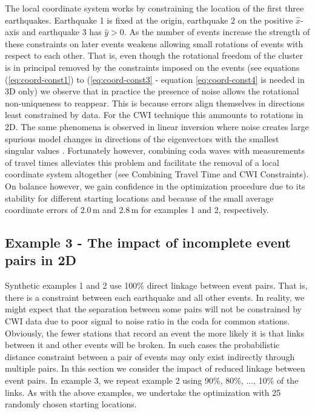 \documentclass[12pt,double]{article}
\begin{document}
The local coordinate system works by constraining the location of
the first three earthquakes. Earthquake 1 is fixed at the origin,
earthquake 2 on the positive $\hat{x}$-axis and earthquake 3 has
$\hat{y}>0$. As the number of events increase the strength of these
constraints on later events weakens allowing small rotations of
events with respect to each other. That is, even though the
rotational freedom of the cluster is in principal removed by the
constraints imposed on the events (see equations
(\ref{eq:coord-const1}) to (\ref{eq:coord-const3} - equation
\ref{eq:coord-const4} is needed in 3D only) we observe that in
practice the presence of noise allows the rotational non-uniqueness
to reappear. This is because errors align themselves in directions
least constrained by data. For the CWI technique this ammounts to rotations in 2D.
The same phenomena is observed in linear inversion where noise
creates large spurious model changes in directions of the
eigenvectors with the smallest singular values \citep{dr_Aster05a}.
 Fortunately however, combining coda waves with
measurements of travel times alleviates this problem and facilitate
the removal of a local coordinate system altogether (see Combining Travel Time and 
CWI Constraints). On balance however, we gain
confidence in the optimization procedure due to its stability for
different starting locations and because of the small average
coordinate errors of 2.0\,m and 2.8\,m for examples 1 and 2,
respectively.

\subsection*{Example 3 - The impact of incomplete event pairs in 2D}

Synthetic examples 1 and 2 use 100\% direct linkage between event
pairs. That is, there is a constraint between each earthquake and
all other events. In reality, we might expect that the separation
between some pairs will not be constrained by CWI data due to poor
signal to noise ratio in the coda for common stations. Obviously,
the fewer stations that record an event the more likely it is that
links between it and other events will be broken. In such cases the
probabilistic distance constraint between a pair of events may only
exist indirectly through multiple pairs. In this section we consider
the impact of reduced linkage between event pairs. In example 3, we
repeat example 2 using 90\%, 80\%, ..., 10\% of the links. As with
the above examples, we undertake the optimization with 25 randomly
chosen starting locations.
\end{document}

